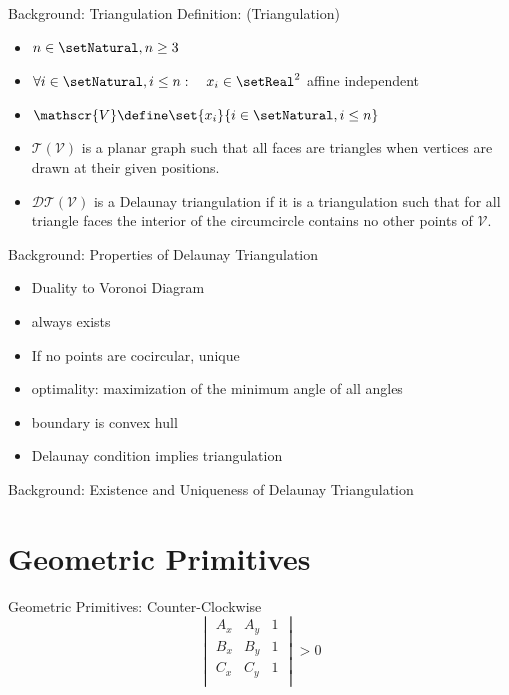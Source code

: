 \documentclass[aspectratio=169]{beamer}
\begin{document}
\begin{frame}{Background: Triangulation}
  Definition: (Triangulation)
  \begin{itemize}
    \item $n\in\setNatural, n\geq 3$
    \item $\forall i\in\setNatural, i \leq n: \quad x_i \in \setReal^2$ affine independent
    \item $\mathscr{V}\define \set{x_i}{i\in\setNatural, i \leq n}$
    \item $\mathscr{T}(\mathscr{V})$ is a planar graph such that all faces are triangles when vertices are drawn at their given positions.
    \item $\mathscr{DT}(\mathscr{V})$ is a Delaunay triangulation if it is a triangulation such that for all triangle faces the interior of the circumcircle contains no other points of $\mathscr{V}$.
  \end{itemize}
\end{frame}

\begin{frame}{Background: Properties of Delaunay Triangulation}
  \begin{itemize}
    \item Duality to Voronoi Diagram
    \item always exists
    \item If no points are cocircular, unique
    \item optimality: maximization of the minimum angle of all angles
    \item boundary is convex hull
    \item Delaunay condition implies triangulation
  \end{itemize}
\end{frame}

\begin{frame}{Background: Existence and Uniqueness of Delaunay Triangulation}
\end{frame}

\section{Geometric Primitives}
\begin{frame}{Geometric Primitives: Counter-Clockwise}
  \[
    \begin{vmatrix}
      A_x & A_y & 1 \\
      B_x & B_y & 1 \\
      C_x & C_y & 1 \\
    \end{vmatrix}
    > 0
  \]
\end{frame}
\end{document}
